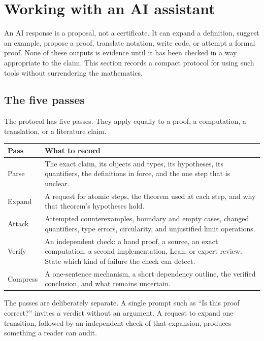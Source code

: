 \section{Working with an AI assistant}\label{appC:sec:ai}
An AI response is a proposal, not a certificate. It can expand a definition, suggest an example, propose a proof, translate notation, write code, or attempt a formal proof. None of these outputs is evidence until it has been checked in a way appropriate to the claim. This section records a compact protocol for using such tools without surrendering the mathematics.

\subsection*{The five passes}
The protocol has five passes. They apply equally to a proof, a computation, a translation, or a literature claim.

\begin{center}
\begin{tabularx}{\textwidth}{@{}p{}X@{}}
\toprule
Pass & What to record\\\midrule
Parse & The exact claim, its objects and types, its hypotheses, its quantifiers, the definitions in force, and the one step that is unclear.\\
Expand & A request for atomic steps, the theorem used at each step, and why that theorem's hypotheses hold.\\
Attack & Attempted counterexamples, boundary and empty cases, changed quantifiers, type errors, circularity, and unjustified limit operations.\\
Verify & An independent check: a hand proof, a source, an exact computation, a second implementation, Lean, or expert review. State which kind of failure the check can detect.\\
Compress & A one-sentence mechanism, a short dependency outline, the verified conclusion, and what remains uncertain.\\
\bottomrule
\end{tabularx}
\end{center}

The passes are deliberately separate. A single prompt such as ``Is this proof correct?'' invites a verdict without an argument. A request to expand one transition, followed by an independent check of that expansion, produces something a reader can audit.

